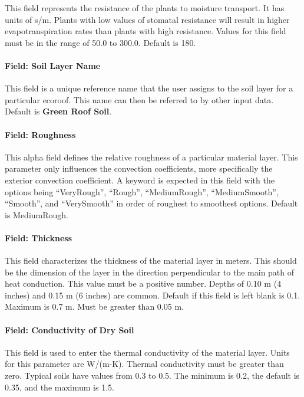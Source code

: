 This field represents the resistance of the plants to moisture transport. It has units of s/m. Plants with low values of stomatal resistance will result in higher evapotranspiration rates than plants with high resistance. Values for this field must be in the range of 50.0 to 300.0. Default is 180.

\paragraph{Field: Soil Layer Name}\label{field-soil-layer-name}

This field is a unique reference name that the user assigns to the soil layer for a particular ecoroof. This name can then be referred to by other input data. Default is \textbf{Green Roof Soil}.

\paragraph{Field: Roughness}\label{field-roughness-2}

This alpha field defines the relative roughness of a particular material layer. This parameter only influences the convection coefficients, more specifically the exterior convection coefficient. A keyword is expected in this field with the options being ``VeryRough'', ``Rough'', ``MediumRough'', ``MediumSmooth'', ``Smooth'', and ``VerySmooth'' in order of roughest to smoothest options. Default is MediumRough.

\paragraph{Field: Thickness}\label{field-thickness-9}

This field characterizes the thickness of the material layer in meters. This should be the dimension of the layer in the direction perpendicular to the main path of heat conduction. This value must be a positive number. Depths of 0.10 m (4 inches) and 0.15 m (6 inches) are common. Default if this field is left blank is 0.1. Maximum is 0.7 m. Must be greater than 0.05 m.

\paragraph{Field: Conductivity of Dry Soil}\label{field-conductivity-of-dry-soil}

This field is used to enter the thermal conductivity of the material layer. Units for this parameter are W/(m-K). Thermal conductivity must be greater than zero. Typical soils have values from 0.3 to 0.5. The minimum is 0.2, the default is 0.35, and the maximum is 1.5.

